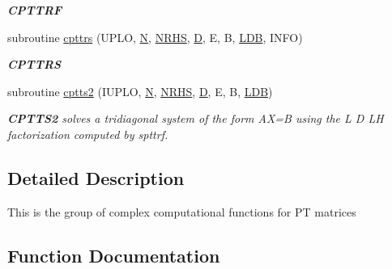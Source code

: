 \begin{DoxyCompactItemize}
\begin{DoxyCompactList}\small\item\em {\bfseries C\+P\+T\+T\+R\+F} \end{DoxyCompactList}\item 
subroutine \hyperlink{group__complexPTcomputational_ga63605a86c7011a213f3e3f95c98cda5c}{cpttrs} (U\+P\+L\+O, \hyperlink{polmisc_8c_a0240ac851181b84ac374872dc5434ee4}{N}, \hyperlink{example__user_8c_aa0138da002ce2a90360df2f521eb3198}{N\+R\+H\+S}, \hyperlink{odrpack_8h_a7dae6ea403d00f3687f24a874e67d139}{D}, E, B, \hyperlink{example__user_8c_a50e90a7104df172b5a89a06c47fcca04}{L\+D\+B}, I\+N\+F\+O)
\begin{DoxyCompactList}\small\item\em {\bfseries C\+P\+T\+T\+R\+S} \end{DoxyCompactList}\item 
subroutine \hyperlink{group__complexPTcomputational_gadecb0ce69b03e2b960effe0754e322d4}{cptts2} (I\+U\+P\+L\+O, \hyperlink{polmisc_8c_a0240ac851181b84ac374872dc5434ee4}{N}, \hyperlink{example__user_8c_aa0138da002ce2a90360df2f521eb3198}{N\+R\+H\+S}, \hyperlink{odrpack_8h_a7dae6ea403d00f3687f24a874e67d139}{D}, E, B, \hyperlink{example__user_8c_a50e90a7104df172b5a89a06c47fcca04}{L\+D\+B})
\begin{DoxyCompactList}\small\item\em {\bfseries C\+P\+T\+T\+S2} solves a tridiagonal system of the form A\+X=B using the L D L\+H factorization computed by spttrf. \end{DoxyCompactList}\end{DoxyCompactItemize}


\subsection{Detailed Description}
This is the group of complex computational functions for P\+T matrices 

\subsection{Function Documentation}
\hypertarget{group__complexPTcomputational_ga4e9b4c5682a455e0c1a60ca3166a050c}{}
